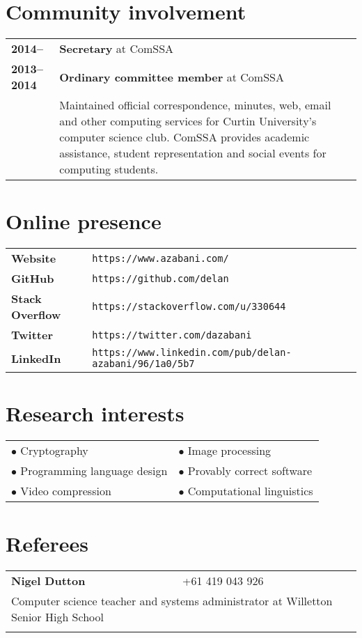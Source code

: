 \documentclass[a4paper,12pt]{article}
\begin{document}
\section*{Community involvement}

\begin{tabular}{p{3.5cm}p{12.5cm}}
	\textbf{2014--} &
		\textbf{Secretary} at ComSSA\\
	\textbf{2013--2014} &
		\textbf{Ordinary committee member} at ComSSA\\ &
		Maintained official correspondence, minutes, web, email and
		other computing services for Curtin University's computer
		science club. ComSSA provides academic assistance, student
		representation and social events for computing students.
\end{tabular}

\section*{Online presence}

\begin{tabular}{p{3.5cm}p{12.5cm}}
	\textbf{Website} &
		\texttt{https://www.azabani.com/}\\
	\textbf{GitHub} &
		\texttt{https://github.com/delan}\\
	\textbf{Stack Overflow} &
		\texttt{https://stackoverflow.com/u/330644}\\
	\textbf{Twitter} &
		\texttt{https://twitter.com/dazabani}\\
	\textbf{LinkedIn} &
		\texttt{https://www.linkedin.com/pub/delan-azabani/96/1a0/5b7}
\end{tabular}

\section*{Research interests}

\begin{tabular}{p{8cm}p{8cm}}
	$\bullet$ Cryptography &
	$\bullet$ Image processing \\
	$\bullet$ Programming language design &
	$\bullet$ Provably correct software \\
	$\bullet$ Video compression &
	$\bullet$ Computational linguistics
\end{tabular}

\section*{Referees}

\begin{tabular}{p{3.5cm}p{12.5cm}}
	\textbf{Nigel Dutton} &
		+61 419 043 926\\
	\multicolumn{2}{p{17cm}}{
		Computer science teacher and systems administrator
		at Willetton Senior High School
	}\\\\
\end{tabular}
\end{document}
